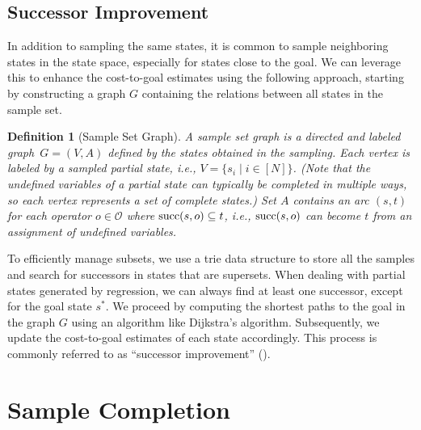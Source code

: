\documentclass[ppgc,diss,english]{iiufrgs}
\newtheorem{definition}{Definition}
\begin{document}
\subsection{Successor Improvement}
\label{sec:sample-sui}
In addition to sampling the same states, it is common to sample neighboring states in the state space, especially for states close to the goal. We can leverage this to enhance the cost-to-goal estimates using the following approach, starting by constructing a graph $G$ containing the relations between all states in the sample set.
%
\begin{definition}[Sample Set Graph]\label{def:graph}
A sample set graph is a directed and labeled graph~$G = (V, A)$ defined by the states obtained in the sampling. Each vertex is labeled by a sampled partial state, i.e., $V = \{s_i \mid i \in [N]\}$. (Note that the undefined variables of a partial state can typically be completed in multiple ways, so each vertex represents a set of complete states.) Set $A$ contains an arc $(s,t)$ for each operator $o \in \mathcal{O}$ where $\operatorname{succ}(s,o) \subseteq t$, i.e., $\operatorname{succ}(s,o)$ can become $t$ from an assignment of undefined variables.
\end{definition}

To efficiently manage subsets, we use a trie data structure to store all the samples and search for successors in states that are supersets. When dealing with partial states generated by regression, we can always find at least one successor, except for the goal state $s^{*}$. We proceed by computing the shortest paths to the goal in the graph $G$ using an algorithm like Dijkstra's algorithm. Subsequently, we update the cost-to-goal estimates of each state accordingly. This process is commonly referred to as ``successor improvement'' (\sui).


\section{Sample Completion}
\label{sec:sample-completion}
\end{document}
